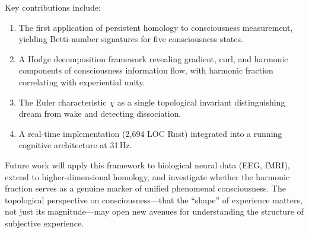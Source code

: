 \documentclass[11pt,a4paper]{article}
\begin{document}
Key contributions include:
\begin{enumerate}
  \item The first application of persistent homology to consciousness measurement, yielding Betti-number signatures for five consciousness states.
  \item A Hodge decomposition framework revealing gradient, curl, and harmonic components of consciousness information flow, with harmonic fraction correlating with experiential unity.
  \item The Euler characteristic $\chi$ as a single topological invariant distinguishing dream from wake and detecting dissociation.
  \item A real-time implementation (2,694 LOC Rust) integrated into a running cognitive architecture at 31\,Hz.
\end{enumerate}

Future work will apply this framework to biological neural data (EEG, fMRI), extend to higher-dimensional homology, and investigate whether the harmonic fraction serves as a genuine marker of unified phenomenal consciousness.
The topological perspective on consciousness---that the ``shape'' of experience matters, not just its magnitude---may open new avenues for understanding the structure of subjective experience.



\end{document}
